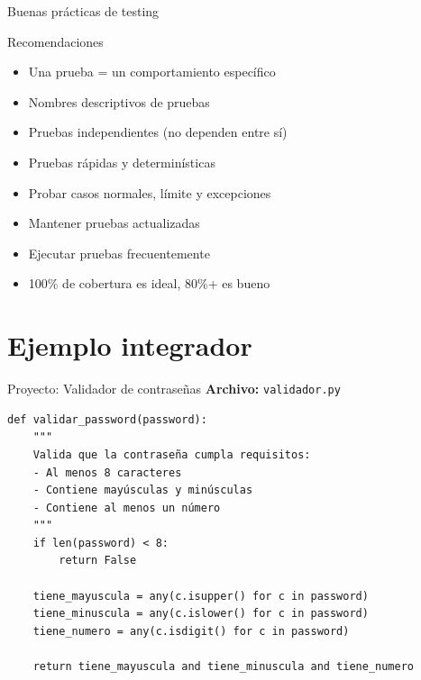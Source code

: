 \documentclass{beamer}
\begin{document}
\begin{frame}{Buenas prácticas de testing \faCheckDouble}
\begin{conceptbox}{Recomendaciones}
\small
\begin{itemize}
    \item[\faCheck] Una prueba = un comportamiento específico
    \item[\faCheck] Nombres descriptivos de pruebas
    \item[\faCheck] Pruebas independientes (no dependen entre sí)
    \item[\faCheck] Pruebas rápidas y determinísticas
    \item[\faCheck] Probar casos normales, límite y excepciones
    \item[\faCheck] Mantener pruebas actualizadas
    \item[\faCheck] Ejecutar pruebas frecuentemente
    \item[\faCheck] 100\% de cobertura es ideal, 80\%+ es bueno
\end{itemize}
\end{conceptbox}
\end{frame}

\section{Ejemplo integrador}

\begin{frame}[fragile]{Proyecto: Validador de contraseñas \faLock}
\textbf{Archivo:} \texttt{validador.py}
\begin{lstlisting}
def validar_password(password):
    """
    Valida que la contraseña cumpla requisitos:
    - Al menos 8 caracteres
    - Contiene mayúsculas y minúsculas
    - Contiene al menos un número
    """
    if len(password) < 8:
        return False
    
    tiene_mayuscula = any(c.isupper() for c in password)
    tiene_minuscula = any(c.islower() for c in password)
    tiene_numero = any(c.isdigit() for c in password)
    
    return tiene_mayuscula and tiene_minuscula and tiene_numero
\end{lstlisting}
\end{frame}
\end{document}
